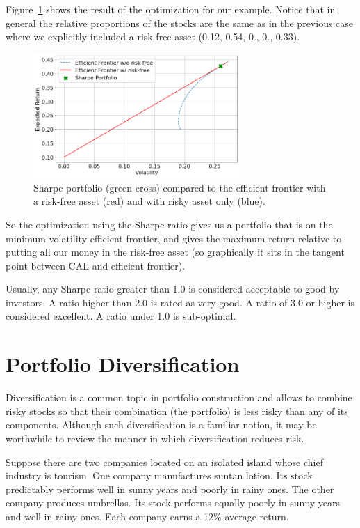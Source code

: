 Figure~\ref{fig:sharpe_ratio} shows the result of the optimization for our example. Notice that in general the relative proportions of the stocks are the same as in the previous case where we explicitly included a risk free asset (0.12, 0.54, 0., 0., 0.33).

\begin{figure}[htb]
	\centering
	\includegraphics[width=0.7\textwidth]{figures/sharpe_ratio}
	\caption{Sharpe portfolio (green cross) compared to the efficient frontier with a risk-free asset (red) and with risky asset only (blue).}
	\label{fig:sharpe_ratio}
\end{figure}

So the optimization using the Sharpe ratio gives us a portfolio that is on the minimum volatility efficient frontier, and gives the maximum return relative to putting all our money in the risk-free asset (so graphically it sits in the tangent point between CAL and efficient frontier).

Usually, any Sharpe ratio greater than 1.0 is considered acceptable to good by investors. A ratio higher than 2.0 is rated as very good. A ratio of 3.0 or higher is considered excellent. A ratio under 1.0 is sub-optimal.

\section{Portfolio Diversification}

Diversification is a common topic in portfolio construction and allows to combine risky stocks so that their combination (the portfolio) is less risky than any of its components. Although such diversification is a familiar notion, it may be worthwhile to review the manner in which diversification reduces risk.

Suppose there are two companies located on an isolated island whose chief industry is tourism. One company manufactures suntan lotion. Its stock predictably performs well in sunny years and poorly in rainy ones. The other company produces umbrellas. Its stock performs equally poorly in sunny years and well in rainy ones. Each company earns a 12\% average return.

